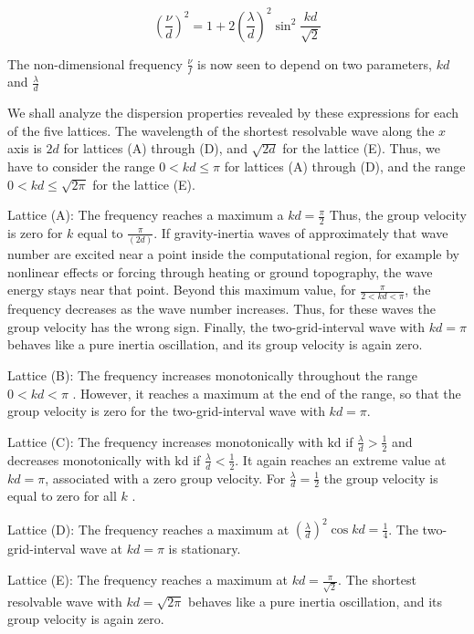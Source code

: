\[\left(\frac{\nu}{d}\right)^2 = 1 + 2\left(\frac{\lambda}{d}\right)^2 \sin^2{\frac{kd}{\sqrt{2}}}\]

The non-dimensional frequency \(\frac{\nu}{f}\) is now seen to depend on
two parameters, \(kd\) and \(\frac{\lambda}{d}\)

We shall analyze the dispersion properties revealed by these expressions
for each of the five lattices. The wavelength of the shortest resolvable
wave along the \(x\) axis is \(2d\) for lattices (A) through (D), and
\(\sqrt{2d}\) for the lattice (E). Thus, we have to consider the range
\(0 < kd \leq \pi\) for lattices (A) through (D), and the range
\(0 < kd \leq \sqrt{2\pi}\) for the lattice (E).

Lattice (A): The frequency reaches a maximum a \( kd = \frac{\pi}{2}\)
Thus, the group velocity is zero for \(k\) equal to
\(\frac{\pi}{\left( 2d \right)}\). If gravity-inertia waves of
approximately that wave number are excited near a point inside the
computational region, for example by nonlinear effects or forcing
through heating or ground topography, the wave energy stays near that
point. Beyond this maximum value, for \(\frac{\pi}{2 < kd < \pi}\), the
frequency decreases as the wave number increases. Thus, for these waves
the group velocity has the wrong sign. Finally, the two-grid-interval
wave with \(kd = \pi\) behaves like a pure inertia oscillation, and its
group velocity is again zero.

Lattice (B): The frequency increases monotonically throughout the range
\(0 < kd < \pi\) . However, it reaches a maximum at the end of the
range, so that the group velocity is zero for the two-grid-interval wave
with \(kd = \pi.\)

Lattice (C): The frequency increases monotonically with \(\text{kd}\) if
\(\frac{\lambda}{d} > \frac{1}{2} \) and decreases monotonically with
\(\text{kd}\) if \(\frac{\lambda}{d} < \frac{1}{2}\). It again reaches
an extreme value at \(kd = \pi\), associated with a zero group velocity.
For \(\frac{\lambda}{d} = \frac{1}{2}\) the group velocity is equal to
zero for all \(k\) .

Lattice (D): The frequency reaches a maximum at
\(\left( \frac{\lambda}{d} \right)^{2}\cos{kd} = \frac{1}{4}\). The
two-grid-interval wave at \(kd = \pi\) is stationary.

Lattice (E): The frequency reaches a maximum at
\(kd = \frac{\pi}{\sqrt{2}}\). The shortest resolvable wave with
\(kd = \sqrt{2\pi}\) behaves like a pure inertia oscillation, and its
group velocity is again zero.

